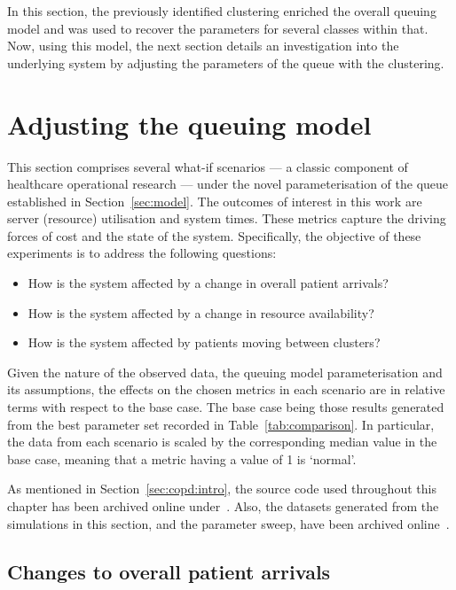 In this section, the previously identified clustering enriched the overall
queuing model and was used to recover the parameters for several classes within
that. Now, using this model, the next section details an investigation into the
underlying system by adjusting the parameters of the queue with the clustering.

\section{Adjusting the queuing model}\label{sec:scenarios}

This section comprises several what-if scenarios --- a classic component of
healthcare operational research --- under the novel parameterisation of the
queue established in Section~\ref{sec:model}. The outcomes of interest in this
work are server (resource) utilisation and system times. These metrics capture
the driving forces of cost and the state of the system. Specifically, the
objective of these experiments is to address the following questions:
\begin{itemize}
    \item How is the system affected by a change in overall patient arrivals?
    \item How is the system affected by a change in resource availability?
    \item How is the system affected by patients moving between clusters?
\end{itemize}

Given the nature of the observed data, the queuing model parameterisation and
its assumptions, the effects on the chosen metrics in each scenario are in
relative terms with respect to the base case. The base case being those results
generated from the best parameter set recorded in Table~\ref{tab:comparison}. In
particular, the data from each scenario is scaled by the corresponding median
value in the base case, meaning that a metric having a value of 1 is `normal'.

As mentioned in Section~\ref{sec:copd:intro}, the source code used throughout
this chapter has been archived online under~. Also,
the datasets generated from the simulations in this section, and the parameter
sweep, have been archived online~.


\subsection{Changes to overall patient arrivals}\label{subsec:arrivals}

